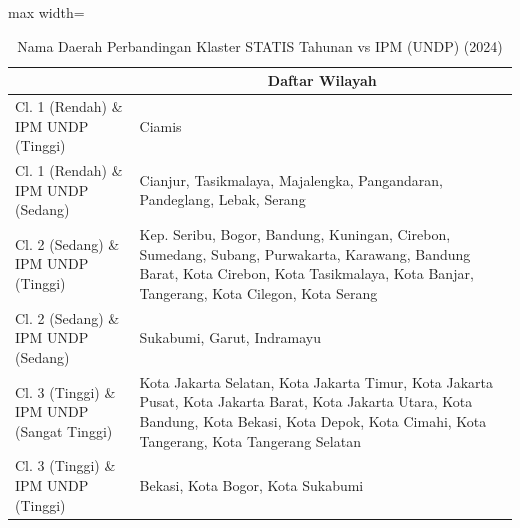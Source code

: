 \begin{table}[H]
\centering
\caption{Nama Daerah Perbandingan Klaster STATIS Tahunan vs IPM (UNDP) (2024)} \label{tab:app1statis_ipm_name_2024}
\begin{adjustbox}{max width=\textwidth}
\begin{tabular}{|>{\centering\arraybackslash}p{4cm}|p{10cm}|}
\hline
\multicolumn{1}{|c|}{\textbf{Kategori}} & \multicolumn{1}{c|}{\textbf{Daftar Wilayah}} \\
\hline
Cl. 1 (Rendah) \& IPM UNDP (Tinggi) & Ciamis \\
\hline
Cl. 1 (Rendah) \& IPM UNDP (Sedang) & Cianjur, Tasikmalaya, Majalengka, Pangandaran, Pandeglang, Lebak, Serang \\
\hline
Cl. 2 (Sedang) \& IPM UNDP (Tinggi) & Kep. Seribu, Bogor, Bandung, Kuningan, Cirebon, Sumedang, Subang, Purwakarta, Karawang, Bandung Barat, Kota Cirebon, Kota Tasikmalaya, Kota Banjar, Tangerang, Kota Cilegon, Kota Serang \\
\hline
Cl. 2 (Sedang) \& IPM UNDP (Sedang) & Sukabumi, Garut, Indramayu \\
\hline
Cl. 3 (Tinggi) \& IPM UNDP (Sangat Tinggi) & Kota Jakarta Selatan, Kota Jakarta Timur, Kota Jakarta Pusat, Kota Jakarta Barat, Kota Jakarta Utara, Kota Bandung, Kota Bekasi, Kota Depok, Kota Cimahi, Kota Tangerang, Kota Tangerang Selatan \\
\hline
Cl. 3 (Tinggi) \& IPM UNDP (Tinggi) & Bekasi, Kota Bogor, Kota Sukabumi \\
\hline
\end{tabular}
\end{adjustbox}
\end{table}